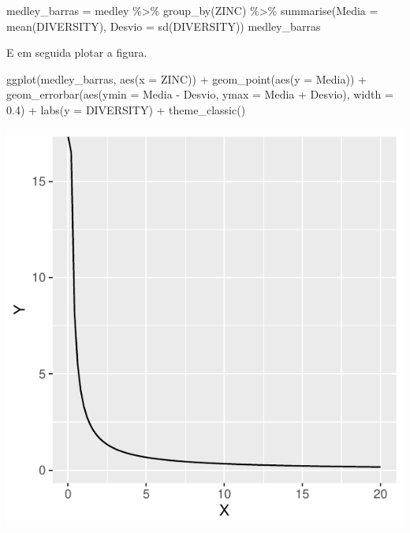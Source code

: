 \documentclass[
]{book}
\newenvironment{Shaded}{\begin{snugshade}}{\end{snugshade}}
\newcommand{\AttributeTok}[1]{\textcolor[rgb]{0.77,0.63,0.00}{#1}}
\newcommand{\FloatTok}[1]{\textcolor[rgb]{0.00,0.00,0.81}{#1}}
\newcommand{\FunctionTok}[1]{\textcolor[rgb]{0.00,0.00,0.00}{#1}}
\newcommand{\NormalTok}[1]{#1}
\newcommand{\OtherTok}[1]{\textcolor[rgb]{0.56,0.35,0.01}{#1}}
\newcommand{\SpecialCharTok}[1]{\textcolor[rgb]{0.00,0.00,0.00}{#1}}
\newcommand{\StringTok}[1]{\textcolor[rgb]{0.31,0.60,0.02}{#1}}
\begin{document}
\begin{Shaded}
\begin{Highlighting}[]
\NormalTok{medley\_barras }\OtherTok{=}\NormalTok{ medley }\SpecialCharTok{\%\textgreater{}\%} 
  \FunctionTok{group\_by}\NormalTok{(ZINC) }\SpecialCharTok{\%\textgreater{}\%} 
  \FunctionTok{summarise}\NormalTok{(}\AttributeTok{Media =} \FunctionTok{mean}\NormalTok{(DIVERSITY),}
            \AttributeTok{Desvio =} \FunctionTok{sd}\NormalTok{(DIVERSITY))}
\NormalTok{medley\_barras}
\end{Highlighting}
\end{Shaded}

E em seguida plotar a figura.

\begin{Shaded}
\begin{Highlighting}[]
\FunctionTok{ggplot}\NormalTok{(medley\_barras, }\FunctionTok{aes}\NormalTok{(}\AttributeTok{x =}\NormalTok{ ZINC)) }\SpecialCharTok{+}
  \FunctionTok{geom\_point}\NormalTok{(}\FunctionTok{aes}\NormalTok{(}\AttributeTok{y =}\NormalTok{ Media)) }\SpecialCharTok{+}
  \FunctionTok{geom\_errorbar}\NormalTok{(}\FunctionTok{aes}\NormalTok{(}\AttributeTok{ymin =}\NormalTok{ Media }\SpecialCharTok{{-}}\NormalTok{ Desvio,}
                    \AttributeTok{ymax =}\NormalTok{ Media }\SpecialCharTok{+}\NormalTok{ Desvio), }\AttributeTok{width =} \FloatTok{0.4}\NormalTok{) }\SpecialCharTok{+}
  \FunctionTok{labs}\NormalTok{(}\AttributeTok{y =} \StringTok{\textquotesingle{}DIVERSITY\textquotesingle{}}\NormalTok{) }\SpecialCharTok{+}
  \FunctionTok{theme\_classic}\NormalTok{()}
\end{Highlighting}
\end{Shaded}

\includegraphics{probest-cambientais_files/figure-latex/unnamed-chunk-220-1.pdf}
\end{document}
